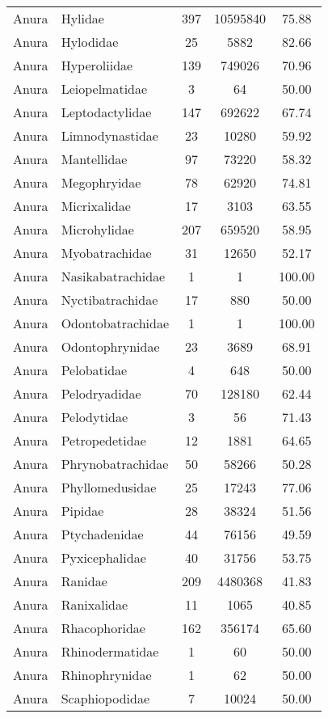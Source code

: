 \begin{longtable}{llccc}
  Anura & Hylidae & 397 & 10595840 & 75.88 \\ 
  Anura & Hylodidae &  25 & 5882 & 82.66 \\ 
  Anura & Hyperoliidae & 139 & 749026 & 70.96 \\ 
  Anura & Leiopelmatidae &   3 &  64 & 50.00 \\ 
  Anura & Leptodactylidae & 147 & 692622 & 67.74 \\ 
  Anura & Limnodynastidae &  23 & 10280 & 59.92 \\ 
  Anura & Mantellidae &  97 & 73220 & 58.32 \\ 
  Anura & Megophryidae &  78 & 62920 & 74.81 \\ 
  Anura & Micrixalidae &  17 & 3103 & 63.55 \\ 
  Anura & Microhylidae & 207 & 659520 & 58.95 \\ 
  Anura & Myobatrachidae &  31 & 12650 & 52.17 \\ 
  Anura & Nasikabatrachidae &   1 &   1 & 100.00 \\ 
  Anura & Nyctibatrachidae &  17 & 880 & 50.00 \\ 
  Anura & Odontobatrachidae &   1 &   1 & 100.00 \\ 
  Anura & Odontophrynidae &  23 & 3689 & 68.91 \\ 
  Anura & Pelobatidae &   4 & 648 & 50.00 \\ 
  Anura & Pelodryadidae &  70 & 128180 & 62.44 \\ 
  Anura & Pelodytidae &   3 &  56 & 71.43 \\ 
  Anura & Petropedetidae &  12 & 1881 & 64.65 \\ 
  Anura & Phrynobatrachidae &  50 & 58266 & 50.28 \\ 
  Anura & Phyllomedusidae &  25 & 17243 & 77.06 \\ 
  Anura & Pipidae &  28 & 38324 & 51.56 \\ 
  Anura & Ptychadenidae &  44 & 76156 & 49.59 \\ 
  Anura & Pyxicephalidae &  40 & 31756 & 53.75 \\ 
  Anura & Ranidae & 209 & 4480368 & 41.83 \\ 
  Anura & Ranixalidae &  11 & 1065 & 40.85 \\ 
  Anura & Rhacophoridae & 162 & 356174 & 65.60 \\ 
  Anura & Rhinodermatidae &   1 &  60 & 50.00 \\ 
  Anura & Rhinophrynidae &   1 &  62 & 50.00 \\ 
  Anura & Scaphiopodidae &   7 & 10024 & 50.00 \\ 

\end{longtable}
